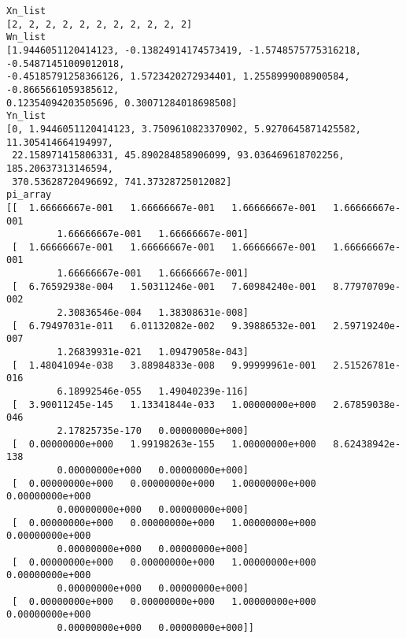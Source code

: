 \documentclass[a4paper,10pt]{article}
\begin{document}
\begin{verbatim}
Xn_list
[2, 2, 2, 2, 2, 2, 2, 2, 2, 2, 2]
Wn_list
[1.9446051120414123, -0.13824914174573419, -1.5748575775316218, -0.54871451009012018, 
-0.45185791258366126, 1.5723420272934401, 1.2558999008900584, -0.8665661059385612,
0.12354094203505696, 0.30071284018698508]
Yn_list
[0, 1.9446051120414123, 3.7509610823370902, 5.9270645871425582, 11.305414664194997,
 22.158971415806331, 45.890284858906099, 93.036469618702256, 185.20637313146594,
 370.53628720496692, 741.37328725012082]
pi_array
[[  1.66666667e-001   1.66666667e-001   1.66666667e-001   1.66666667e-001
         1.66666667e-001   1.66666667e-001]
 [  1.66666667e-001   1.66666667e-001   1.66666667e-001   1.66666667e-001
         1.66666667e-001   1.66666667e-001]
 [  6.76592938e-004   1.50311246e-001   7.60984240e-001   8.77970709e-002
         2.30836546e-004   1.38308631e-008]
 [  6.79497031e-011   6.01132082e-002   9.39886532e-001   2.59719240e-007
         1.26839931e-021   1.09479058e-043]
 [  1.48041094e-038   3.88984833e-008   9.99999961e-001   2.51526781e-016
         6.18992546e-055   1.49040239e-116]
 [  3.90011245e-145   1.13341844e-033   1.00000000e+000   2.67859038e-046
         2.17825735e-170   0.00000000e+000]
 [  0.00000000e+000   1.99198263e-155   1.00000000e+000   8.62438942e-138
         0.00000000e+000   0.00000000e+000]
 [  0.00000000e+000   0.00000000e+000   1.00000000e+000   0.00000000e+000
         0.00000000e+000   0.00000000e+000]
 [  0.00000000e+000   0.00000000e+000   1.00000000e+000   0.00000000e+000
         0.00000000e+000   0.00000000e+000]
 [  0.00000000e+000   0.00000000e+000   1.00000000e+000   0.00000000e+000
         0.00000000e+000   0.00000000e+000]
 [  0.00000000e+000   0.00000000e+000   1.00000000e+000   0.00000000e+000
         0.00000000e+000   0.00000000e+000]]
\end{verbatim}
\end{document}
